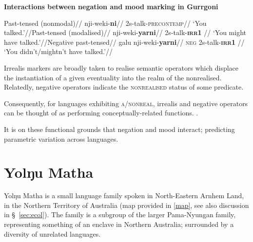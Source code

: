 	\pex{}
\textbf{Interactions between negation and mood marking in Gurrgoni} 
\iffalse	\a\begingl\glpreamble present-tensed //
\gla dji-na-ni wurrparn//
\glb 3s/3o-see-\textsc{precontemp} emu//
\glft `They didn't see an emu'//\endgl b.\quad\begingl\glpreamble neg present-tensed //
\gla galu dji-na-djirni djit-bolupu nuyu//
\glb \textsc{neg} 3s/3o-see-\textsc{irr} 3s-mother  //
\glft text//\endgl \fi

\a\begingl\glpreamble Past-tensed (nonmodal)//
\gla nji-weki-\textbf{ni}//
\glb 2s-talk-\textsc{precontemp}//
\glft `You talked.'//\endgl \a\begingl\glpreamble Past-tensed (modalised)//
\gla nji-weki-\textbf{yarni}//
\glb 2s-talk-\textsc{\textbf{irr1}}  //
\glft `You might have talked.'//\endgl	\a\begingl\glpreamble Negative past-tensed//
\gla galu nji-weki-\textbf{yarni}//
\glb \textsc{neg} 2s-talk-\textsc{\textbf{irr1}}  //
\glft `You didn't/mightn't have talked.'//\endgl


\xe



Irrealis markers are broadly taken to realise semantic operators which displace the instantiation of a given eventuality into the realm of the nonrealised. Relatedly, negative operators indicate the \textsc{nonrealised} status of some predicate.

Consequently, for languages exhibiting \textsc{a/nonreal}, irrealis and negative operators can be thought of as performing conceptually-related functions. \citep[see also][208]{Miestamo2005}.

 It is on these functional grounds that negation and mood interact; predicting parametric variation across languages.




\section{Yolŋu Matha}

Yolŋu Matha is a small language family spoken in North-Eastern Arnhem Land, in the Northern Territory of Australia (map provided in \ref{map}, see also discussion in \S~\ref{sec:ecol}). The family is a subgroup of the larger Pama-Nyungan family, representing something of an enclave in Northern Australia; surrounded by a diversity of unrelated languages.

